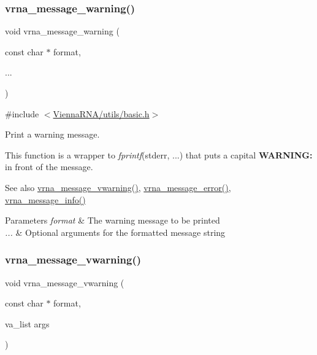 \subsubsection{\texorpdfstring{vrna\+\_\+message\+\_\+warning()}{vrna\_message\_warning()}}
{\footnotesize\ttfamily void vrna\+\_\+message\+\_\+warning (\begin{DoxyParamCaption}\item[{const char $\ast$}]{format,  }\item[{}]{... }\end{DoxyParamCaption})}



{\ttfamily \#include $<$\hyperlink{utils_2basic_8h}{Vienna\+R\+N\+A/utils/basic.\+h}$>$}



Print a warning message. 

This function is a wrapper to {\itshape fprintf}(stderr, ...) that puts a capital {\bfseries W\+A\+R\+N\+I\+NG\+:} in front of the message.

\begin{DoxySeeAlso}{See also}
\hyperlink{group__message__utils_ga377aa8ec8a49d343063adb22e6311f26}{vrna\+\_\+message\+\_\+vwarning()}, \hyperlink{group__message__utils_ga36b35be01d7f36cf7f59c245eee628d1}{vrna\+\_\+message\+\_\+error()}, \hyperlink{group__message__utils_ga039bae6153a6415b054dbe6045f83d03}{vrna\+\_\+message\+\_\+info()}
\end{DoxySeeAlso}

\begin{DoxyParams}{Parameters}
{\em format} & The warning message to be printed \\
\hline
{\em ...} & Optional arguments for the formatted message string \\
\hline
\end{DoxyParams}
\mbox{\label{group__message__utils_ga377aa8ec8a49d343063adb22e6311f26}} 
\subsubsection{\texorpdfstring{vrna\+\_\+message\+\_\+vwarning()}{vrna\_message\_vwarning()}}
{\footnotesize\ttfamily void vrna\+\_\+message\+\_\+vwarning (\begin{DoxyParamCaption}\item[{const char $\ast$}]{format,  }\item[{va\+\_\+list}]{args }\end{DoxyParamCaption})}



